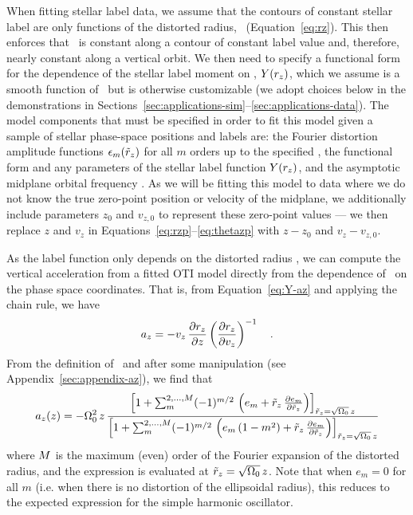 When fitting stellar label data, we assume that the contours of constant stellar label
are only functions of the distorted radius, \rz\ (Equation~\ref{eq:rz}).
This then enforces that \rz\ is constant along a contour of constant label value and,
therefore, nearly constant along a vertical orbit.
We then need to specify a functional form for the dependence of the stellar label moment
on \rz, $Y(r_z)$, which we assume is a smooth function of \rz\ but is otherwise
customizable (we adopt choices below in the demonstrations in
Sections~\ref{sec:applications-sim}--\ref{sec:applications-data}).
The model components that must be specified in order to fit this model given a sample of
stellar phase-space positions and labels are: the Fourier distortion amplitude functions
$\epsilon_m(\tilde{r}_z)$ for all $m$ orders up to the specified \mmax, the functional form and
any parameters of the stellar label function $Y(r_z)$, and the asymptotic midplane
orbital frequency \freqzero.
As we will be fitting this model to data where we do not know the true zero-point
position or velocity of the midplane, we additionally include parameters $z_0$ and
$v_{z,0}$ to represent these zero-point values --- we then replace $z$ and $v_z$ in
Equations~\ref{eq:rzp}--\ref{eq:thetazp} with $z-z_0$ and $v_z - v_{z, 0}$.

As the label function only depends on the distorted radius \rz, we can compute the
vertical acceleration from a fitted OTI model directly from the dependence of \rz\ on
the phase space coordinates.
That is, from Equation~\ref{eq:Y-az} and applying the chain rule, we have
\begin{equation}
    a_z = - v_z \, \frac{\partial {r_z}}{\partial {z}} \left(\frac{\partial {r_z}}{\partial {v_z}}\right)^{-1} \quad .
\end{equation}
From the definition of \rz\ and after some manipulation (see
Appendix~\ref{sec:appendix-az}), we find that
\begin{equation}
    a_z(z) = - \Omega_0^2 \, z \,
    \frac{\left[
        1 + \sum_{m}^{{2, \dots, M}} (-1)^{m/2} \,
            \left(e_m + \tilde{r}_z \, \frac{\partial e_m}{\partial \tilde{r}_z}\right)
    \right]_{\tilde{r}_z = \sqrt{\Omega_0}\,z}}{\left[
        1 + \sum_{m}^{{2, \dots, M}} (-1)^{m/2} \,
            \left(e_m\,(1 - m^2) + \tilde{r}_z \, \frac{\partial e_m}{\partial \tilde{r}_z}\right)
    \right]_{\tilde{r}_z = \sqrt{\Omega_0}\,z}} \label{eq:az-ugly}
\end{equation}
where $M$ is the maximum (even) order of the Fourier expansion of the distorted
radius, and the expression is evaluated at $\tilde{r}_z = \sqrt{\Omega_0}\,z$.
Note that when $e_m = 0$ for all $m$ (i.e. when there is no distortion of the
ellipsoidal radius), this reduces to the expected expression for the simple harmonic
oscillator.

